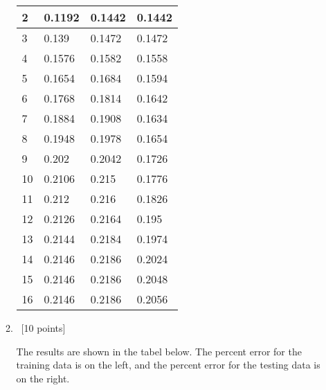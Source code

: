 \documentclass[12pt, fullpage,letterpaper]{article}
\begin{document}
\begin{enumerate}
\begin{enumerate}
\begin{tabular}{|l|l|l|l|}
			2  & 0.1192           & 0.1442     & 0.1442         \\ \hline
			3  & 0.139            & 0.1472     & 0.1472         \\ \hline
			4  & 0.1576           & 0.1582     & 0.1558         \\ \hline
			5  & 0.1654           & 0.1684     & 0.1594         \\ \hline
			6  & 0.1768           & 0.1814     & 0.1642         \\ \hline
			7  & 0.1884           & 0.1908     & 0.1634         \\ \hline
			8  & 0.1948           & 0.1978     & 0.1654         \\ \hline
			9  & 0.202            & 0.2042     & 0.1726         \\ \hline
			10 & 0.2106           & 0.215      & 0.1776         \\ \hline
			11 & 0.212            & 0.216      & 0.1826         \\ \hline
			12 & 0.2126           & 0.2164     & 0.195          \\ \hline
			13 & 0.2144           & 0.2184     & 0.1974         \\ \hline
			14 & 0.2146           & 0.2186     & 0.2024         \\ \hline
			15 & 0.2146           & 0.2186     & 0.2048         \\ \hline
			16 & 0.2146           & 0.2186     & 0.2056         \\ \hline
			\end{tabular}
	\item~[10 points] 
	
	The results are shown in the tabel below. The percent error for the training data is on the left, and the percent error for the testing data is on the right.



\end{enumerate}
\end{enumerate}
\end{document}
